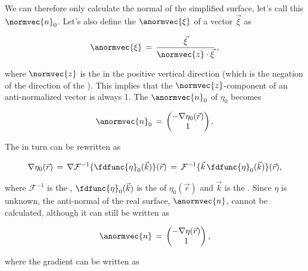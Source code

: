 {We can therefore only calculate the normal of the simplified surface, let's call this $\normvec{n}_0$. Let's also define the  $\anormvec{\xi}$ of a vector $\vec{\xi}$ as

\begin{equation}
\anormvec{\xi} \,=\, \frac{\vec{\xi}}{\normvec{z}\cdot\vec{\xi}}\,,
\end{equation}

where $\normvec{z}$ is the  in the positive vertical direction (which is the negation of the direction of the ). This implies that the $\normvec{z}$-component of an anti-normalized vector is always 1. The  $\anormvec{n}_0$ of $\eta_0$ becomes

\begin{equation}
\anormvec{n}_0 \,=\, \left(\!\!\!\begin{array}{c}-\nabla\eta_0(\vec{r}) \\ 1\end{array}\!\!\!\right).
\end{equation}

The \gradient in turn can be rewritten as

\begin{equation}
\nabla\eta_0(\vec{r}) \,=\, \nabla\mathcal{F}^{-1}\{\fdfunc{\eta}_0(\vec{k})\}(\vec{r}) \,=\, \mathcal{F}^{-1}\{\vec{k}\,\fdfunc{\eta}_0(\vec{k})\}(\vec{r}),
\end{equation}

where $\mathcal{F}^{-1}$ is the , $\fdfunc{\eta}_0(\vec{k})$ is the  of $\eta_0(\vec{r})$ and $\vec{k}$ is the . Since $\eta$ is unknown, the anti-normal of the real surface, $\anormvec{n}$, cannot be calculated, although it can still be written as

\begin{equation}
\anormvec{n} \,=\, \left(\!\!\!\begin{array}{c}-\nabla\eta(\vec{r}) \\ 1\end{array}\!\!\!\right),
\end{equation}

where the gradient can be written as

}
